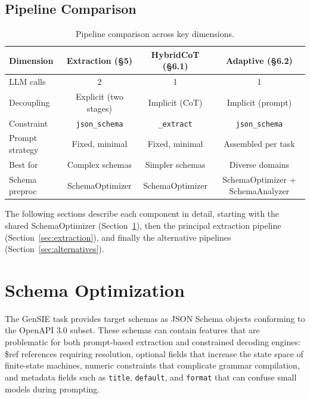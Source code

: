 \documentclass{ceurart}
\begin{document}
\subsection{Pipeline Comparison}

\begin{table}
  \caption{Pipeline comparison across key dimensions.}
  \label{tab:pipeline-comparison}
  \centering
  \small
  \begin{tabular}{lccc}
    \toprule
    Dimension & Extraction (\S5) & HybridCoT (\S6.1) & Adaptive (\S6.2) \\
    \midrule
    LLM calls       & 2                         & 1                  & 1 \\
    Decoupling      & Explicit (two stages)     & Implicit (CoT)     & Implicit (prompt) \\
    Constraint      & \texttt{json\_schema}     & \texttt{\_extract} & \texttt{json\_schema} \\
    Prompt strategy & Fixed, minimal            & Fixed, minimal     & Assembled per task \\
    Best for        & Complex schemas           & Simpler schemas    & Diverse domains \\
    Schema preproc  & SchemaOptimizer           & SchemaOptimizer    & SchemaOptimizer + SchemaAnalyzer \\
    \bottomrule
  \end{tabular}
\end{table}

The following sections describe each component in detail, starting with the shared
SchemaOptimizer (Section~\ref{sec:schema-optimization}), then the principal extraction
pipeline (Section~\ref{sec:extraction}), and finally the alternative pipelines
(Section~\ref{sec:alternatives}).

\section{Schema Optimization}
\label{sec:schema-optimization}

The GenSIE task provides target schemas as JSON Schema objects conforming to the
OpenAPI 3.0 subset.
These schemas can contain features that are problematic for both prompt-based
extraction and constrained decoding engines: \$ref references requiring resolution,
optional fields that increase the state space of finite-state machines, numeric
constraints that complicate grammar compilation, and metadata fields such as
\texttt{title}, \texttt{default}, and \texttt{format} that can confuse small models
during prompting.
\end{document}

